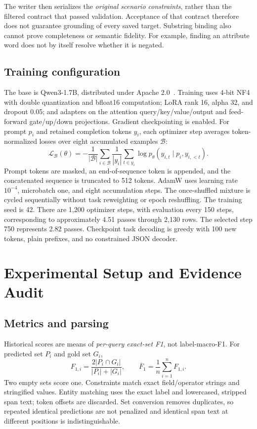 \documentclass{article}
\newcommand{\Fmacro}{\overline{F}_1}
\begin{document}
The writer then serializes the \emph{original scenario constraints}, rather than the filtered contract that passed validation. Acceptance of that contract therefore does not guarantee grounding of every saved target. Substring binding also cannot prove completeness or semantic fidelity. For example, finding an attribute word does not by itself resolve whether it is negated.



\subsection{Training configuration}
The base is Qwen3-1.7B, distributed under Apache 2.0~\cite{qwenmodel}. Training uses 4-bit NF4 with double quantization and bfloat16 computation; LoRA rank 16, alpha 32, and dropout 0.05; and adapters on the attention query/key/value/output and feed-forward gate/up/down projections. Gradient checkpointing is enabled. For prompt $p_i$ and retained completion tokens $y_i$, each optimizer step averages token-normalized losses over eight accumulated examples $\mathcal{B}$:
\begin{equation}
\mathcal{L}_{\mathcal{B}}(\theta)=-\frac{1}{|\mathcal{B}|}\sum_{i\in\mathcal{B}}\frac{1}{|y_i|}\sum_{t\in y_i}\log p_\theta(y_{i,t}\mid p_i,y_{i,<t}).
\end{equation}
Prompt tokens are masked, an end-of-sequence token is appended, and the concatenated sequence is truncated to 512 tokens. AdamW uses learning rate $10^{-4}$, microbatch one, and eight accumulation steps. The once-shuffled mixture is cycled sequentially without task reweighting or epoch reshuffling. The training seed is 42. There are 1,200 optimizer steps, with evaluation every 150 steps, corresponding to approximately 4.51 passes through 2,130 rows. The selected step 750 represents 2.82 passes. Checkpoint task decoding is greedy with 100 new tokens, plain prefixes, and no constrained JSON decoder.

\section{Experimental Setup and Evidence Audit}
\label{sec:protocol}
\subsection{Metrics and parsing}
Historical scores are means of \emph{per-query exact-set F1}, not label-macro-F1. For predicted set $P_i$ and gold set $G_i$,
\begin{equation}
 F_{1,i}=\frac{2|P_i\cap G_i|}{|P_i|+|G_i|},\qquad
 \Fmacro=\frac{1}{n}\sum_{i=1}^n F_{1,i}.
\end{equation}
Two empty sets score one. Constraints match exact field/operator strings and stringified values. Entity matching uses the exact label and lowercased, stripped span text; token offsets are discarded. Set conversion removes duplicates, so repeated identical predictions are not penalized and identical span text at different positions is indistinguishable.
\end{document}
